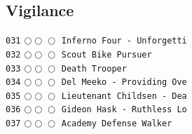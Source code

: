 \documentclass[a4paper,landscape]{article}
\begin{document}
\begin{multicols*}{5}
\section{Vigilance} 
\vspace{-2mm} 
\texttt{031} \(\bigcirc\!\bigcirc\!\bigcirc\)  \texttt{Inferno Four - Unforgetti} \vspace{-0.3mm}\\ 
\texttt{032} \(\bigcirc\!\bigcirc\!\bigcirc\)  \texttt{Scout Bike Pursuer} \vspace{-0.3mm}\\ 
\texttt{033} \(\bigcirc\!\bigcirc\!\bigcirc\)  \texttt{Death Trooper} \vspace{-0.3mm}\\ 
\texttt{034} \(\bigcirc\!\bigcirc\!\bigcirc\)  \texttt{Del Meeko - Providing Ove} \vspace{-0.3mm}\\ 
\texttt{035} \(\bigcirc\!\bigcirc\!\bigcirc\)  \texttt{Lieutenant Childsen - Dea} \vspace{-0.3mm}\\ 
\texttt{036} \(\bigcirc\!\bigcirc\!\bigcirc\)  \texttt{Gideon Hask - Ruthless Lo} \vspace{-0.3mm}\\ 
\texttt{037} \(\bigcirc\!\bigcirc\!\bigcirc\)  \texttt{Academy Defense Walker} \vspace{-0.3mm}\\ 

\end{multicols*}
\end{document}
